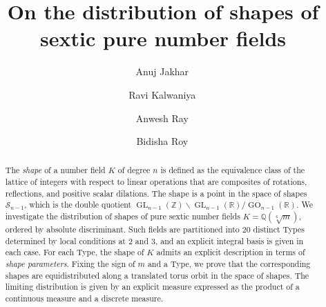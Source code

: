 \documentclass[table]{amsart}
\newcommand{\Q}{\mathbb{Q}}
\newcommand{\op}[1]{\operatorname{#1}}
\numberwithin{equation}{section}
\begin{document}
\title[Shapes of sextic pure number fields
]{On the distribution of shapes of sextic pure number fields
}

\author[A.~Jakhar]{Anuj Jakhar\, }
\address[Jakhar]{Indian Institute Of Technology, Chennai, Tamil Nadu 600036, India}

\author[R.~Kalwaniya]{Ravi Kalwaniya\, }
\address[Kalwaniya]{Indian Institute Of Technology, Chennai, Tamil Nadu 600036, India}

\author[A.~Ray]{Anwesh Ray\, }
\address[Ray]{Chennai Mathematical Institute, H1, SIPCOT IT Park, Kelambakkam, Siruseri, Tamil Nadu 603103, India}

\author[B.~Roy]{Bidisha Roy\, }
\address[Roy]{Indian Institute of Technology Tirupati, Yerpedu-Venkatagiri Road, Tirupati, Andhra Pradesh 517619, India}




\subjclass[2020]{}

\maketitle

\begin{abstract}
The \emph{shape} of a number field $K$ of degree $n$ is defined as the equivalence class of the lattice of integers with respect to linear operations that are composites of rotations, reflections, and positive scalar dilations. The shape is a point in the space of shapes $\mathcal{S}_{n-1}$, which is the double quotient $\op{GL}_{n-1}(\mathbb{Z}) \backslash \op{GL}_{n-1}(\mathbb{R}) / \op{GO}_{n-1}(\mathbb{R})$. We investigate the distribution of shapes of pure sextic number fields
$K=\Q(\sqrt[6]{m})$, ordered by absolute discriminant.
Such fields are partitioned into $20$ distinct Types determined by local conditions at $2$ and $3$, and an explicit integral basis is given in each case.
For each Type, the shape of $K$ admits an explicit description in terms
of \emph{shape parameters}.
Fixing the sign of $m$ and a Type, we prove that the corresponding shapes
are equidistributed along a translated torus orbit in the space of shapes.
The limiting distribution is given by an explicit measure expressed as the product of a continuous measure and a discrete
measure.
\end{abstract}
\end{document}
